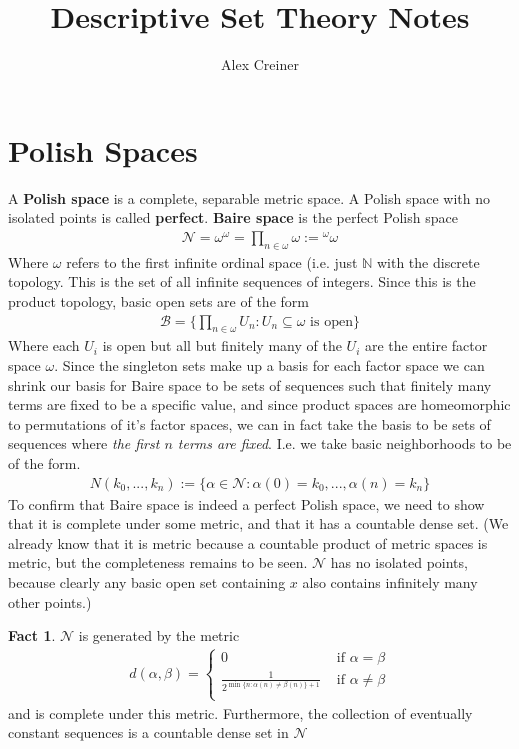 \documentclass{article}
\title{Descriptive Set Theory Notes}
\author{Alex Creiner}
\theoremstyle{definition}
\newtheorem{fact}{Fact}[section]
\theoremstyle{plain}
\begin{document}
\maketitle
\section{Polish Spaces}
A \textbf{Polish space} is a complete, separable metric space. A Polish space with no isolated points is called \textbf{perfect}. \textbf{Baire space} is the perfect Polish space 
\begin{align}
    \mathcal{N} = \omega^{\omega} = \prod_{n \in \omega}\omega := {}^{\omega}\omega
\end{align}
Where $\omega$ refers to the first infinite ordinal space (i.e. just $\mathbb{N}$ with the discrete topology.
This is the set of all infinite sequences of integers. Since this is the product topology, basic open sets are of the form 
\begin{align}
    \mathcal{B} = \{\prod_{n \in \omega} U_n: U_n \subseteq \omega \textrm{ is open} \}
\end{align}
Where each $U_i$ is open but all but finitely many of the $U_i$ are the entire factor space $\omega$. Since the singleton sets make up a basis for each factor space we can shrink our basis for Baire space to be sets of sequences such that finitely many terms are fixed to be a specific value, and since product spaces are homeomorphic to permutations of it's factor spaces, we can in fact take the basis to be sets of sequences where \textit{the first $n$ terms are fixed}. I.e. we take basic neighborhoods to be of the form.
\begin{align}
    N(k_0,...,k_n) := \{\alpha \in \mathcal{N}: \alpha(0) = k_0,...,\alpha(n) = k_n \}
\end{align}
To confirm that Baire space is indeed a perfect Polish space, we need to show that it is complete under some metric, and that it has a countable dense set. (We already know that it is metric because a countable product of metric spaces is metric, but the completeness remains to be seen. $\mathcal{N}$ has no isolated points, because clearly any basic open set containing $x$ also contains infinitely many other points.)
\begin{fact}
    $\mathcal{N}$ is generated by the metric
    \begin{align}
        d(\alpha,\beta) = \begin{cases}
                            0 & \textrm{ if } \alpha = \beta \\
                            \frac{1}{2^{\min\{n: \alpha(n) \neq \beta(n)\}+1}} & \textrm{ if } \alpha \neq \beta \\
                          \end{cases}
    \end{align}
    and is complete under this metric. Furthermore, the collection of eventually constant sequences is a countable dense set in $\mathcal{N}$
\end{fact}
\end{document}
